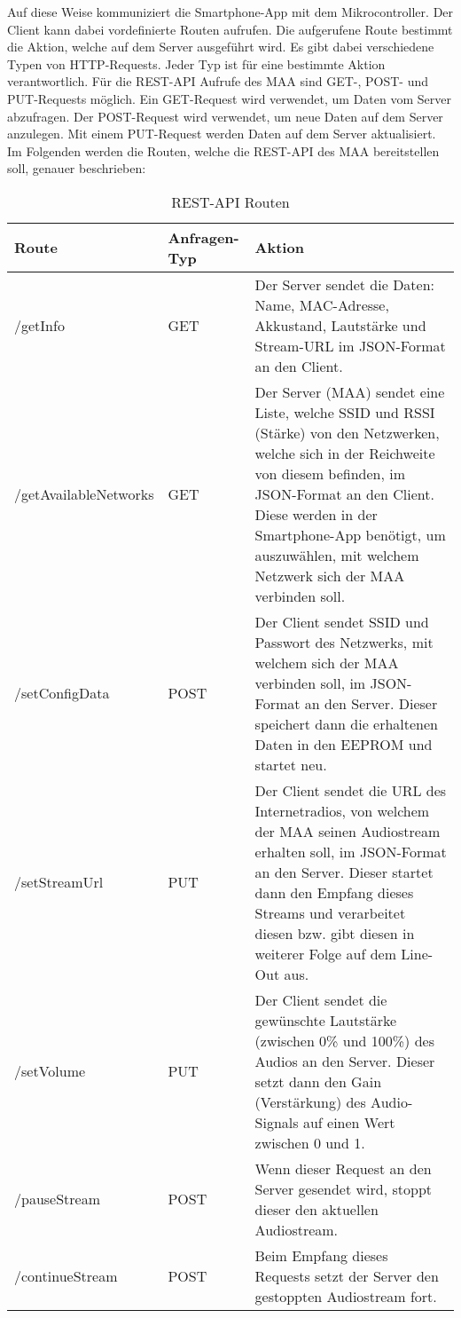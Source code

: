 \documentclass[11pt, twoside]{article}
\begin{document}
Auf diese Weise kommuniziert die Smartphone-App mit dem Mikrocontroller. Der Client kann dabei vordefinierte Routen aufrufen. Die aufgerufene Route bestimmt die Aktion, welche auf dem Server ausgeführt wird. Es gibt dabei verschiedene Typen von HTTP-Requests. Jeder Typ ist für eine bestimmte Aktion verantwortlich. Für die REST-API Aufrufe des MAA sind GET-, POST- und PUT-Requests möglich. Ein GET-Request wird verwendet, um Daten vom Server abzufragen. Der POST-Request wird verwendet, um neue Daten auf dem Server anzulegen. Mit einem PUT-Request werden Daten auf dem Server aktualisiert. \parencite[vgl.][]{noauthor_urlpi13_nodate} \newline
Im Folgenden werden die Routen, welche die REST-API des MAA bereitstellen soll, genauer beschrieben: \newline \\
\begin{table}[H]
\begin{tabularx}{\textwidth}{|l|l|X|}
\hline
\textbf{Route} & \textbf{Anfragen-Typ} & \textbf{Aktion} \\
\hline
/getInfo & GET & Der Server sendet die Daten: Name, MAC-Adresse, Akkustand, Lautstärke und Stream-URL im JSON-Format an den Client. \\
\hline 
/getAvailableNetworks & GET & Der Server (MAA) sendet eine Liste, welche SSID und RSSI (Stärke) von den Netzwerken, welche sich in der Reichweite von diesem befinden, im JSON-Format an den Client. Diese werden in der Smartphone-App benötigt, um auszuwählen, mit welchem Netzwerk sich der MAA verbinden soll.\\
\hline
/setConfigData & POST & Der Client sendet SSID und Passwort des Netzwerks, mit welchem sich der MAA verbinden soll, im JSON-Format an den Server. Dieser speichert dann die erhaltenen Daten in den EEPROM und startet neu.\\
\hline
/setStreamUrl & PUT & Der Client sendet die URL des Internetradios, von welchem der MAA seinen Audiostream erhalten soll, im JSON-Format an den Server. Dieser startet dann den Empfang dieses Streams und verarbeitet diesen bzw. gibt diesen in weiterer Folge auf dem Line-Out aus. \\
\hline
/setVolume & PUT & Der Client sendet die gewünschte Lautstärke (zwischen 0\% und 100\%) des Audios an den Server. Dieser setzt dann den Gain (Verstärkung) des Audio-Signals auf einen Wert zwischen 0 und 1. \\
\hline
/pauseStream & POST & Wenn dieser Request an den Server gesendet wird, stoppt dieser den aktuellen Audiostream. \\
\hline
/continueStream & POST & Beim Empfang dieses Requests setzt der Server den gestoppten Audiostream fort. \\
\hline
\end{tabularx} 
\caption{REST-API Routen}
\end{table}
\end{document}
